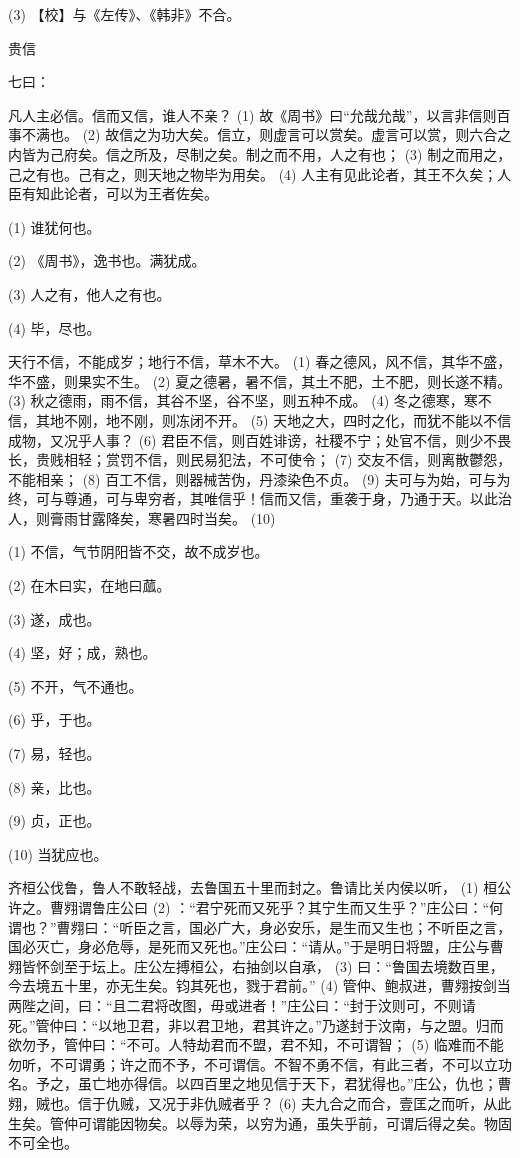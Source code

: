 \documentclass[12pt,UTF8]{ctexbook}
\begin{document}
(3) 【校】与《左传》、《韩非》不合。





贵信


七曰：

凡人主必信。信而又信，谁人不亲？ (1) 故《周书》曰“允哉允哉”，以言非信则百事不满也。 (2) 故信之为功大矣。信立，则虚言可以赏矣。虚言可以赏，则六合之内皆为己府矣。信之所及，尽制之矣。制之而不用，人之有也； (3) 制之而用之，己之有也。己有之，则天地之物毕为用矣。 (4) 人主有见此论者，其王不久矣；人臣有知此论者，可以为王者佐矣。

(1) 谁犹何也。

(2) 《周书》，逸书也。满犹成。

(3) 人之有，他人之有也。

(4) 毕，尽也。

天行不信，不能成岁；地行不信，草木不大。 (1) 春之德风，风不信，其华不盛，华不盛，则果实不生。 (2) 夏之德暑，暑不信，其土不肥，土不肥，则长遂不精。 (3) 秋之德雨，雨不信，其谷不坚，谷不坚，则五种不成。 (4) 冬之德寒，寒不信，其地不刚，地不刚，则冻闭不开。 (5) 天地之大，四时之化，而犹不能以不信成物，又况乎人事？ (6) 君臣不信，则百姓诽谤，社稷不宁；处官不信，则少不畏长，贵贱相轻；赏罚不信，则民易犯法，不可使令； (7) 交友不信，则离散鬱怨，不能相亲； (8) 百工不信，则器械苦伪，丹漆染色不贞。 (9) 夫可与为始，可与为终，可与尊通，可与卑穷者，其唯信乎！信而又信，重袭于身，乃通于天。以此治人，则膏雨甘露降矣，寒暑四时当矣。 (10)

(1) 不信，气节阴阳皆不交，故不成岁也。

(2) 在木曰实，在地曰蓏。

(3) 遂，成也。

(4) 坚，好；成，熟也。

(5) 不开，气不通也。

(6) 乎，于也。

(7) 易，轻也。

(8) 亲，比也。

(9) 贞，正也。

(10) 当犹应也。

齐桓公伐鲁，鲁人不敢轻战，去鲁国五十里而封之。鲁请比关内侯以听， (1) 桓公许之。曹翙谓鲁庄公曰 (2) ：“君宁死而又死乎？其宁生而又生乎？”庄公曰：“何谓也？”曹翙曰：“听臣之言，国必广大，身必安乐，是生而又生也；不听臣之言，国必灭亡，身必危辱，是死而又死也。”庄公曰：“请从。”于是明日将盟，庄公与曹翙皆怀剑至于坛上。庄公左搏桓公，右抽剑以自承， (3) 曰：“鲁国去境数百里，今去境五十里，亦无生矣。钧其死也，戮于君前。” (4) 管仲、鲍叔进，曹翙按剑当两陛之间，曰：“且二君将改图，毋或进者！”庄公曰：“封于汶则可，不则请死。”管仲曰：“以地卫君，非以君卫地，君其许之。”乃遂封于汶南，与之盟。归而欲勿予，管仲曰：“不可。人特劫君而不盟，君不知，不可谓智； (5) 临难而不能勿听，不可谓勇；许之而不予，不可谓信。不智不勇不信，有此三者，不可以立功名。予之，虽亡地亦得信。以四百里之地见信于天下，君犹得也。”庄公，仇也；曹翙，贼也。信于仇贼，又况于非仇贼者乎？ (6) 夫九合之而合，壹匡之而听，从此生矣。管仲可谓能因物矣。以辱为荣，以穷为通，虽失乎前，可谓后得之矣。物固不可全也。
\end{document}
